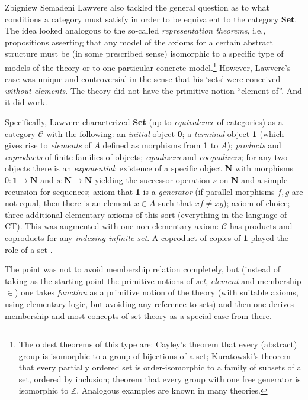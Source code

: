 \begin{artengenv}{Zbigniew Semadeni}
Lawvere also tackled the general question as to what conditions a category 
must satisfy in order to be equivalent to the category \textbf{Set}. The idea looked 
analogous to the so-called \textit{representation theorems}, i.e., propositions 
asserting that any model of the axioms for a certain abstract structure must be 
(in some prescribed sense) isomorphic to a specific type of models of the theory 
or to one particular concrete model.\footnote{The oldest theorems of this type 
are: Cayley's theorem that every (abstract) group is isomorphic to a group of 
bijections of a set; Kuratowski's theorem that every partially ordered set is  
order-isomorphic to a family of subsets of a set, ordered by inclusion; theorem that 
every group with one free generator is isomorphic to $\mathbb{Z}$. 
Analogous examples are known in many theories.} %
However, Lawvere's case was unique and controversial in the sense that his `sets' 
were conceived \textit{without elements}. The theory did not have the primitive 
notion ``element of''. And it did work. 

Specifically, Lawvere characterized \textbf{Set} (up to \textit{equivalence} of 
categories) as a category $\mathcal{C}$ with the following: an \textit{initial} 
object \textbf{0}; a \textit{terminal} object \textbf{1} (which gives rise to 
\textit{elements} of $A$ defined as morphisms from \textbf{1} to $A$); 
\textit{products} and \textit{coproducts} of finite families of objects; 
\textit{equalizers} and \textit{coequalizers}; for any two objects there is an 
\textit{exponential}; existence of a specific object \textbf{N} with morphisms 
$0\colon \mathbf{1} \to \mathbf{N}$ and $s\colon \mathbf{N}\to \mathbf{N}$ yielding 
the successor operation $s$ on $\mathbf{N}$ and a simple recursion for sequences; 
axiom that \textbf{1} is a \textit{generator} (if parallel morphisms $f, g$ are not 
equal, then there is an element $x\in A$ such that $xf\ne xg$); axiom of choice; 
three additional elementary axioms of this sort (everything in the language of CT). 
This was augmented with one non-elementary axiom: $\mathcal{C}$ has products and 
coproducts for any \textit{indexing infinite set}. A coproduct of copies of 
\textbf{1} played the role of a set \parencites[]{Law-Sets}[][pp.386--407]{Form}[][pp.341--345]{Century}.  

The point was not to avoid membership relation completely, but (instead of 
taking as the starting point the primitive notions of \textit{set}, 
\textit{element} and membership $\in $) one takes \textit{function} as a primitive 
notion of the theory (with suitable axioms, using elementary logic, but avoiding any 
reference to sets) and then one derives membership and most concepts of set theory 
as a special case from there. 


\end{artengenv}
